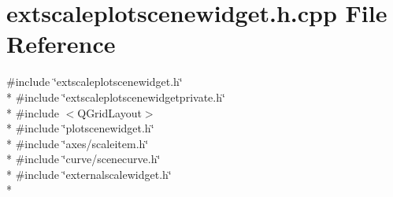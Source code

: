 \section{extscaleplotscenewidget.\+h.\+cpp File Reference}
\label{bk3_2extscaleplotscenewidget_2extscaleplotscenewidget_8h_8cpp}
{\ttfamily \#include \char`\"{}extscaleplotscenewidget.\+h\char`\"{}}\\*
{\ttfamily \#include \char`\"{}extscaleplotscenewidgetprivate.\+h\char`\"{}}\\*
{\ttfamily \#include $<$Q\+Grid\+Layout$>$}\\*
{\ttfamily \#include \char`\"{}plotscenewidget.\+h\char`\"{}}\\*
{\ttfamily \#include \char`\"{}axes/scaleitem.\+h\char`\"{}}\\*
{\ttfamily \#include \char`\"{}curve/scenecurve.\+h\char`\"{}}\\*
{\ttfamily \#include \char`\"{}externalscalewidget.\+h\char`\"{}}\\*
